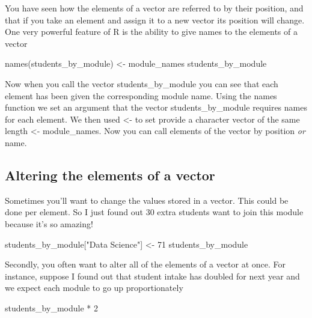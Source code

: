 \documentclass[
]{book}
\newenvironment{Shaded}{\begin{snugshade}}{\end{snugshade}}
\newcommand{\DecValTok}[1]{\textcolor[rgb]{0.00,0.00,0.81}{#1}}
\newcommand{\FunctionTok}[1]{\textcolor[rgb]{0.00,0.00,0.00}{#1}}
\newcommand{\NormalTok}[1]{#1}
\newcommand{\OtherTok}[1]{\textcolor[rgb]{0.56,0.35,0.01}{#1}}
\newcommand{\SpecialCharTok}[1]{\textcolor[rgb]{0.00,0.00,0.00}{#1}}
\newcommand{\StringTok}[1]{\textcolor[rgb]{0.31,0.60,0.02}{#1}}
\begin{document}
You have seen how the elements of a vector are referred to by their position, and that if you take an element and assign it to a new vector its position will change. One very powerful feature of R is the ability to give names to the elements of a vector

\begin{Shaded}
\begin{Highlighting}[]
\FunctionTok{names}\NormalTok{(students\_by\_module) }\OtherTok{\textless{}{-}}\NormalTok{ module\_names}
\NormalTok{students\_by\_module}
\end{Highlighting}
\end{Shaded}

Now when you call the vector students\_by\_module you can see that each element has been given the corresponding module name. Using the names function we set an argument that the vector students\_by\_module requires names for each element. We then used \textless- to set provide a character vector of the same length \textless- module\_names. Now you can call elements of the vector by position \emph{or} name.

\hypertarget{altering-the-elements-of-a-vector}{%
\subsection{Altering the elements of a vector}\label{altering-the-elements-of-a-vector}}

Sometimes you'll want to change the values stored in a vector. This could be done per element. So I just found out 30 extra students want to join this module because it's so amazing!

\begin{Shaded}
\begin{Highlighting}[]
\NormalTok{students\_by\_module[}\StringTok{"Data Science"}\NormalTok{] }\OtherTok{\textless{}{-}} \DecValTok{71}
\NormalTok{students\_by\_module}
\end{Highlighting}
\end{Shaded}

Secondly, you often want to alter all of the elements of a vector at once. For instance, suppose I found out that student intake has doubled for next year and we expect each module to go up proportionately

\begin{Shaded}
\begin{Highlighting}[]
\NormalTok{students\_by\_module }\SpecialCharTok{*} \DecValTok{2}
\end{Highlighting}
\end{Shaded}
\end{document}
